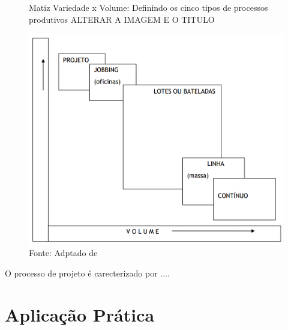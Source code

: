 \begin{figure}[H]
  \caption{Matiz Variedade x Volume: Definindo os cinco tipos de processos produtivos ALTERAR A IMAGEM E O TITULO}
  \includegraphics[scale=0.5]{images/tiposdeprocesso.png}
  \caption*{Fonte: Adptado de \cite{slack2009administraccao}}
  \label{fig:tipos_de_processo_de_producao}
\end{figure}

O processo de projeto é carecterizado por ....

\section{Aplicação Prática} 
\label{sec:tipos_de_processo_de_producao_aplicacao}